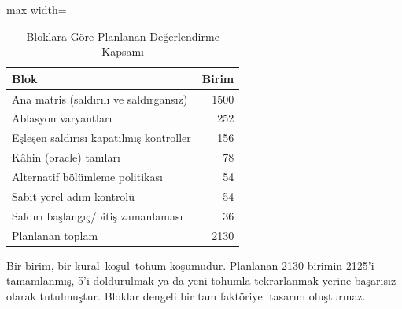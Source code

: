 \begin{table}[!t]
\centering\footnotesize
\setlength{\tabcolsep}{4pt}
\caption{Bloklara Göre Planlanan Değerlendirme Kapsamı}\label{tab:coverage}
\begin{adjustbox}{max width=\columnwidth}
\begin{tabular}{lr}
\toprule
Blok & Birim \\
\midrule
Ana matris (saldırılı ve saldırgansız) & 1500 \\
Ablasyon varyantları & 252 \\
Eşleşen saldırısı kapatılmış kontroller & 156 \\
Kâhin (oracle) tanıları & 78 \\
Alternatif bölümleme politikası & 54 \\
Sabit yerel adım kontrolü & 54 \\
Saldırı başlangıç/bitiş zamanlaması & 36 \\
Planlanan toplam & 2130 \\
\bottomrule
\end{tabular}
\end{adjustbox}

\par\vspace{3pt}\parbox{\linewidth}{\footnotesize Bir birim, bir kural--koşul--tohum koşumudur. Planlanan 2130 birimin 2125'i tamamlanmış, 5'i doldurulmak ya da yeni tohumla tekrarlanmak yerine başarısız olarak tutulmuştur. Bloklar dengeli bir tam faktöriyel tasarım oluşturmaz.}
\end{table}
